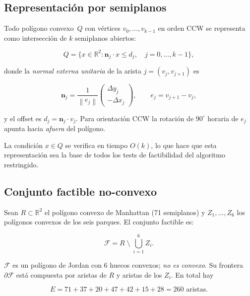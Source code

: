 \documentclass[11pt,a4paper]{article}
\theoremstyle{definition}
\theoremstyle{remark}
\newcommand{\RR}{\mathbb{R}}
\newcommand{\FF}{\mathcal{F}}
\newcommand{\norm}[1]{\left\|#1\right\|}
\begin{document}
\subsection{Representación por semiplanos}

Todo polígono convexo~$Q$ con vértices $v_0, \ldots, v_{k-1}$ en orden CCW se
representa como intersección de $k$ semiplanos abiertos:

\begin{equation}
  Q = \bigl\{ x \in \RR^2 :
       \bm{n}_j \cdot x \leq d_j,\quad j = 0, \ldots, k-1 \bigr\},
  \label{eq:halfplane}
\end{equation}

donde la \emph{normal externa unitaria} de la arista $j = (v_j, v_{j+1})$ es

\begin{equation}
  \bm{n}_j = \frac{1}{\norm{e_j}}
  \begin{pmatrix} \Delta y_j \\ -\Delta x_j \end{pmatrix}, \qquad
  e_j = v_{j+1} - v_j,
  \label{eq:normal}
\end{equation}

y el offset es $d_j = \bm{n}_j \cdot v_j$.  Para orientación CCW la
rotación de $90^\circ$ horaria de $e_j$ apunta hacia \emph{afuera} del polígono.

La condición $x \in Q$ se verifica en tiempo $O(k)$, lo que hace que esta
representación sea la base de todos los tests de factibilidad del algoritmo
restringido.

\subsection{Conjunto factible no-convexo}

Sean $R \subset \RR^2$ el polígono convexo de Manhattan (71 semiplanos) y
$Z_1, \ldots, Z_6$ los polígonos convexos de los seis parques.  El conjunto
factible es:

\begin{equation}
  \FF = R \;\setminus\; \bigcup_{i=1}^6 Z_i.
  \label{eq:F}
\end{equation}

$\FF$ es un polígono de Jordan con 6 huecos convexos; \emph{no es convexo}.
Su frontera $\partial \FF$ está compuesta por aristas de $R$ y aristas de
los $Z_i$.  En total hay

\[
  E = 71 + 37 + 20 + 47 + 42 + 15 + 28 = 260 \text{ aristas.}
\]
\end{document}
